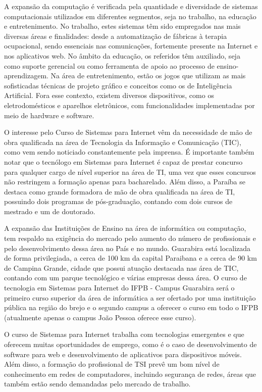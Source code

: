 A expansão da computação é verificada pela quantidade e diversidade de sistemas computacionais utilizados em diferentes segmentos, seja no trabalho, na educação e entretenimento. No trabalho, estes sistemas têm sido empregados nas mais diversas áreas e finalidades: desde a automatização de fábricas à terapia ocupacional, sendo essenciais nas comunicações, fortemente presente na Internet e nos aplicativos web. No âmbito da educação, os referidos têm auxiliado, seja como suporte gerencial ou como ferramenta de apoio ao processo de ensino-aprendizagem. Na área de entretenimento, estão os jogos que utilizam as mais sofisticadas técnicas de projeto gráfico e conceitos como os de Inteligência Artificial. Fora esse contexto, existem diversos dispositivos, como os eletrodomésticos e aparelhos eletrônicos, com funcionalidades implementadas por meio de hardware e software.


O interesse pelo Curso de Sistemas para Internet vêm da necessidade de mão de obra qualificada na área de Tecnologia da Informação e Comunicação (TIC), como vem sendo noticiado constantemente pela imprensa. É importante também notar que o tecnólogo em Sistemas para Internet é capaz de prestar concurso para qualquer cargo de nível superior na área de TI, uma vez que esses concursos não restringem a formação apenas para bacharelado. Além disso, a Paraíba se destaca como grande formadora de mão de obra qualificada na área de TI, possuindo dois programas de pós-graduação, contando com dois cursos de mestrado e um de doutorado.%

A expansão das Instituições de Ensino na área de informática ou computação, tem respaldo na exigência do mercado pelo aumento do número de profissionais e pelo desenvolvimento dessa área no País e no mundo. Guarabira est\'a localizada de forma privilegiada, a cerca de 100 km da capital Paraibana e a cerca de 90 km de Campina Grande, cidade que possui atua\c{c}\~ao destacada nas \'area de TIC, contando com um parque tecnol\'ogico e v\'arias empresas dessa \'area. O curso de tecnologia em Sistemas para Internet do IFPB - Campus Guarabira ser\'a o primeiro curso superior da \'area de inform\'atica a ser ofertado por uma institui\c{c}\~ao p\'ublica na região do brejo e o segundo campus a oferecer o curso em todo o IFPB (atualmente apenas o campus Jo\~ao Pessoa oferece esse curso).

O curso de Sistemas para Internet trabalha com tecnologias emergentes e que oferecem muitas oportunidades de emprego, como é o caso de desenvolvimento de software para web e desenvolvimento de aplicativos para dispositivos móveis. Além disso, a formação do profissional de TSI prevê um bom nível de conhecimento em redes de computadores, incluindo segurança de redes, áreas que também estão sendo demandadas pelo mercado de trabalho.


